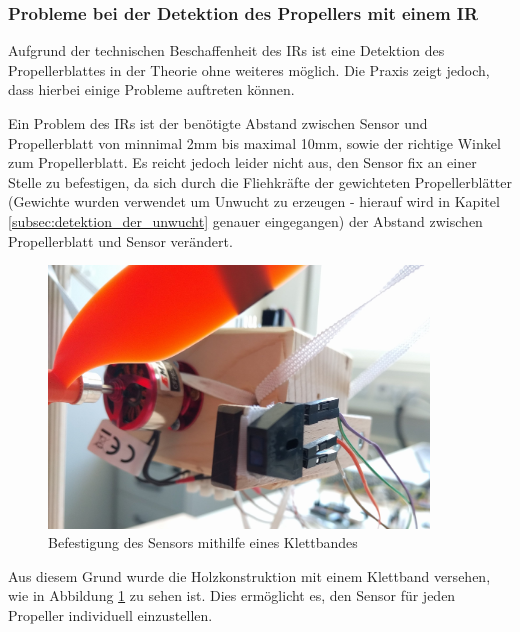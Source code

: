 
\subsubsection*{Probleme bei der Detektion des Propellers mit einem \ac{IR}}
Aufgrund der technischen Beschaffenheit des \ac{IR}s ist eine Detektion des Propellerblattes in der Theorie ohne weiteres möglich.
Die Praxis zeigt jedoch, dass hierbei einige Probleme auftreten können.

Ein Problem des \ac{IR}s ist der benötigte Abstand zwischen Sensor und Propellerblatt von minnimal 2mm bis maximal 10mm, sowie der richtige Winkel zum Propellerblatt.
Es reicht jedoch leider nicht aus, den Sensor fix an einer Stelle zu befestigen, da sich durch die Fliehkräfte der gewichteten Propellerblätter (Gewichte wurden verwendet um Unwucht zu erzeugen - hierauf wird in Kapitel \ref{subsec:detektion_der_unwucht} genauer eingegangen) der Abstand zwischen Propellerblatt und Sensor verändert.
\begin{figure}[H]
	\centering
	\includegraphics[width=0.9\textwidth]{images/chapter/03/exp_ir_sensor.jpg}
	\caption{Befestigung des Sensors mithilfe eines Klettbandes}
	\label{fig:exp_ir_sensor}
\end{figure}
Aus diesem Grund wurde die Holzkonstruktion mit einem Klettband versehen, wie in Abbildung \ref{fig:exp_ir_sensor} zu sehen ist.
Dies ermöglicht es, den Sensor für jeden Propeller individuell einzustellen.

